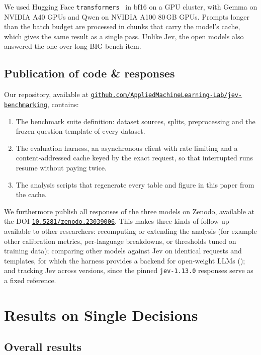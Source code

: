 \documentclass[table]{article}
\begin{document}
We used Hugging Face \texttt{transformers}~\cite{wolf-etal-2020-transformers} in bf16 on a GPU cluster, with Gemma on NVIDIA A40 GPUs and Qwen on NVIDIA A100 80\,GB GPUs. Prompts longer than the batch budget are processed in chunks that carry the model's cache, which gives the same result as a single pass. Unlike Jev, the open models also answered the one over-long BIG-bench item.


\subsection{Publication of code \& responses}
\label{sec:resource}

Our repository, available at \href{https://github.com/AppliedMachineLearning-Lab/jev-benchmarking}{\texttt{github.com/AppliedMachineLearning-Lab/jev-benchmarking}}, contains: 

\begin{enumerate}
    \item The benchmark suite definition: dataset sources, splits, preprocessing and the frozen question template of every dataset.
    \item The evaluation harness, an asynchronous client with rate limiting and a content-addressed cache keyed by the exact request, so that interrupted runs resume without paying twice.
    \item The analysis scripts that regenerate every table and figure in this paper from the cache.
\end{enumerate}

We furthermore publish all responses of the three models on Zenodo, available at the DOI \href{https://doi.org/10.5281/zenodo.23039006}{\texttt{10.5281/zenodo.23039006}}. This makes three kinds of follow-up available to other researchers: recomputing or extending the analysis (for example other calibration metrics, per-language breakdowns, or thresholds tuned on training data); comparing other models against Jev on identical requests and templates, for which the harness provides a backend for open-weight LLMs (); and tracking Jev across versions, since the pinned \texttt{jev-1.13.0} responses serve as a fixed reference.

\section{Results on Single Decisions}
\label{sec:single-results}

\subsection{Overall results}
\end{document}
